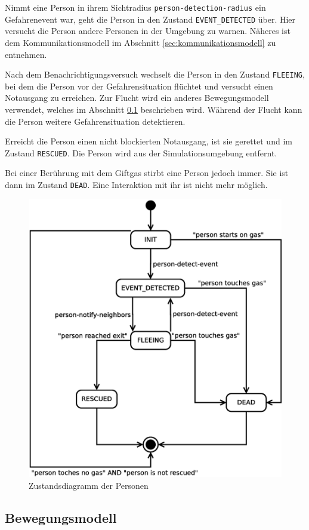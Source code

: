 Nimmt eine Person in ihrem Sichtradius \verb|person-detection-radius| ein Gefahrenevent war, geht die Person in den Zustand \verb|EVENT_DETECTED| über. Hier versucht die Person andere Personen in der Umgebung zu warnen. Näheres ist dem Kommunikationsmodell im Abschnitt \ref{sec:kommunikationsmodell} zu entnehmen.

Nach dem Benachrichtigungsversuch wechselt die Person in den Zustand \verb|FLEEING|, bei dem die Person vor der Gefahrensituation flüchtet und versucht einen Notausgang zu erreichen. Zur Flucht wird ein anderes Bewegungsmodell verwendet, welches im Abschnitt \ref{sec:bewegungsmodell} beschrieben wird. Während der Flucht kann die Person weitere Gefahrensituation detektieren.

Erreicht die Person einen nicht blockierten Notausgang, ist sie gerettet und im Zustand \verb|RESCUED|. Die Person wird aus der Simulationsumgebung entfernt.

Bei einer Berührung mit dem Giftgas stirbt eine Person jedoch immer. Sie ist dann im Zustand \verb|DEAD|. Eine Interaktion mit ihr ist nicht mehr möglich. 


\begin{figure}
\centering
\includegraphics[height=0.6\textwidth]{simulationsumgebung/person.eps}
\caption{Zustandsdiagramm der Personen}
\label{fig:person}
\end{figure}

\subsection{Bewegungsmodell}
\label{sec:bewegungsmodell}

